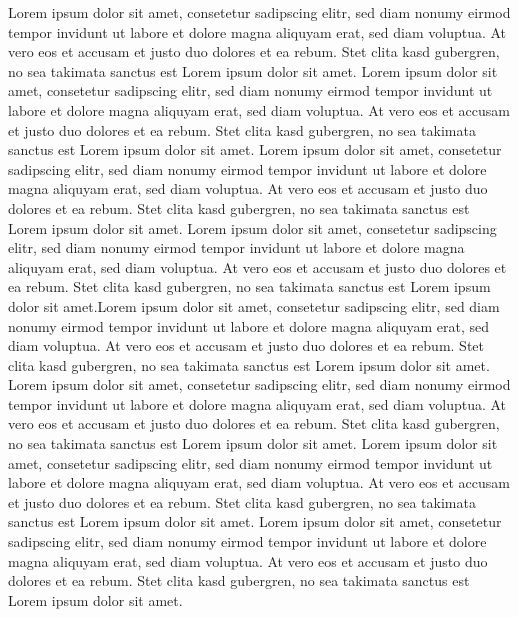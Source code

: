 \documentclass[conference]{IEEEtran}
\begin{document}
Lorem ipsum dolor sit amet, consetetur sadipscing elitr, sed diam nonumy eirmod tempor invidunt ut labore et dolore magna aliquyam erat, sed diam voluptua. At vero eos et accusam et justo duo dolores et ea rebum. Stet clita kasd gubergren, no sea takimata sanctus est Lorem ipsum dolor sit amet. Lorem ipsum dolor sit amet, consetetur sadipscing elitr, sed diam nonumy eirmod tempor invidunt ut labore et dolore magna aliquyam erat, sed diam voluptua. At vero eos et accusam et justo duo dolores et ea rebum. Stet clita kasd gubergren, no sea takimata sanctus est Lorem ipsum dolor sit amet. Lorem ipsum dolor sit amet, consetetur sadipscing elitr, sed diam nonumy eirmod tempor invidunt ut labore et dolore magna aliquyam erat, sed diam voluptua. At vero eos et accusam et justo duo dolores et ea rebum. Stet clita kasd gubergren, no sea takimata sanctus est Lorem ipsum dolor sit amet. Lorem ipsum dolor sit amet, consetetur sadipscing elitr, sed diam nonumy eirmod tempor invidunt ut labore et dolore magna aliquyam erat, sed diam voluptua. At vero eos et accusam et justo duo dolores et ea rebum. Stet clita kasd gubergren, no sea takimata sanctus est Lorem ipsum dolor sit amet.Lorem ipsum dolor sit amet, consetetur sadipscing elitr, sed diam nonumy eirmod tempor invidunt ut labore et dolore magna aliquyam erat, sed diam voluptua. At vero eos et accusam et justo duo dolores et ea rebum. Stet clita kasd gubergren, no sea takimata sanctus est Lorem ipsum dolor sit amet. Lorem ipsum dolor sit amet, consetetur sadipscing elitr, sed diam nonumy eirmod tempor invidunt ut labore et dolore magna aliquyam erat, sed diam voluptua. At vero eos et accusam et justo duo dolores et ea rebum. Stet clita kasd gubergren, no sea takimata sanctus est Lorem ipsum dolor sit amet. Lorem ipsum dolor sit amet, consetetur sadipscing elitr, sed diam nonumy eirmod tempor invidunt ut labore et dolore magna aliquyam erat, sed diam voluptua. At vero eos et accusam et justo duo dolores et ea rebum. Stet clita kasd gubergren, no sea takimata sanctus est Lorem ipsum dolor sit amet. Lorem ipsum dolor sit amet, consetetur sadipscing elitr, sed diam nonumy eirmod tempor invidunt ut labore et dolore magna aliquyam erat, sed diam voluptua. At vero eos et accusam et justo duo dolores et ea rebum. Stet clita kasd gubergren, no sea takimata sanctus est Lorem ipsum dolor sit amet.



\end{document}
